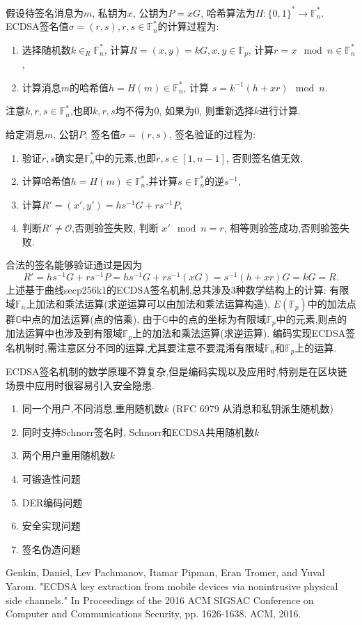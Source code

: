 \documentclass{article}
\renewcommand{\G}{\mathbb{G}}
\newcommand{\F}{\mathbb{F}}
\begin{document}
假设待签名消息为$m$, 私钥为$x$, 公钥为$P=xG$, 哈希算法为$H: \{0,1\}^*\rightarrow\F_n^*$.
ECDSA签名值$\sigma = (r,s), r, s \in \F_n^*$的计算过程为: 
\begin{enumerate}
\item 选择随机数$k\in_R\F_n^*$, 计算$R = (x,y) = kG, x, y \in \F_p$, 计算$r = x\mod n \in \F_n^*$,
\item 计算消息$m$的哈希值$h=H(m)\in\F_n^*$, 计算 $s = k^{-1} (h + xr) \mod n$. 
\end{enumerate}
注意$k, r, s \in \F_n^*$,也即$k, r, s$均不得为0, 如果为0, 则重新选择$k$进行计算.

给定消息$m$, 公钥$P$, 签名值$\sigma = (r, s)$, 签名验证的过程为:
\begin{enumerate}
\item  验证$r, s$确实是$\F_n^*$中的元素,也即$r, s \in [1, n-1]$, 否则签名值无效,
\item 计算哈希值$h=H(m)\in\F_n^*$,并计算$s\in\F_n^*$的逆$s^{-1}$,
\item  计算$R' = (x', y') = hs^{-1}G + rs^{-1}P$, 
\item 判断$R' \neq \mathcal{O}$,否则验签失败, 判断 $x' \mod n = r$, 相等则验签成功,否则验签失败.
\end{enumerate}
合法的签名能够验证通过是因为
$$R' = hs^{-1}G + rs^{-1}P = hs^{-1}G + rs^{-1}(xG) = s^{-1}(h+xr)G = kG = R.$$
上述基于曲线secp256k1的ECDSA签名机制,总共涉及3种数学结构上的计算:
有限域$\F_n$上加法和乘法运算(求逆运算可以由加法和乘法运算构造), $E(\F_p)$中的加法点群$\G$中点的加法运算(点的倍乘),
由于$\G$中的点的坐标为有限域$\F_p$中的元素,则点的加法运算中也涉及到有限域$\F_p$上的加法和乘法运算(求逆运算).
编码实现ECDSA签名机制时,需注意区分不同的运算,尤其要注意不要混淆有限域$\F_n$和$\F_p$上的运算.

ECDSA签名机制的数学原理不算复杂,但是编码实现以及应用时,特别是在区块链场景中应用时很容易引入安全隐患.

\begin{enumerate}
\item 同一个用户,不同消息,重用随机数$k$ (RFC 6979 从消息和私钥派生随机数)
\item 同时支持Schnorr签名时, Schnorr和ECDSA共用随机数$k$
\item 两个用户重用随机数$k$
\item 可锻造性问题
\item DER编码问题
\item 安全实现问题
\item 签名伪造问题
\end{enumerate}

\begin{thebibliography}{99}

Genkin, Daniel, Lev Pachmanov, Itamar Pipman, Eran Tromer, and Yuval Yarom. "ECDSA key extraction from mobile devices via nonintrusive physical side channels." In Proceedings of the 2016 ACM SIGSAC Conference on Computer and Communications Security, pp. 1626-1638. ACM, 2016.

\end{thebibliography}
\end{document}
